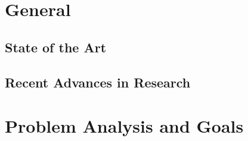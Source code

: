 \section{General}
\subsection{State of the Art}
\subsection{Recent Advances in Research}
\section{Problem Analysis and Goals}
%
%
